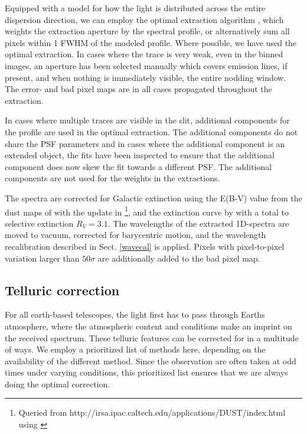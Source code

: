 \documentclass{aa}    %
\begin{document}
Equipped with a model for how the light is distributed across the entire
dispersion direction, we can  employ the optimal extraction algorithm
\cite{Horne1986}, which weights the extraction aperture by the spectral profile,
or alternatively sum all pixels within 1 FWHM of the modeled profile. Where
possible, we have used the optimal extraction. In cases where the trace is very
weak, even in the binned images, an aperture has been selected manually which
covers emission lines, if present, and when nothing is immediately visible, the
entire nodding window. The error- and bad pixel maps are in all cases propagated
throughout the extraction.

In cases where multiple traces are visible in the slit, additional components
for the profile are used in the optimal extraction. The additional components do
not share the PSF parameters and in cases where the additional component is an
extended object, the fits have been inspected to ensure that the additional
component does now skew the fit towards a different PSF. The additional
components are not used for the weights in the extractions.

The spectra are corrected for Galactic extinction using the E(B-V) value from
the dust maps of \citet{Schlegel1998} with the update in
\citet{Schlafly2011}\footnote{Queried from
	http://irsa.ipac.caltech.edu/applications/DUST/index.html using
	\citet{astroquery}}, and the extinction curve by \cite{Cardelli1989} with a
total to selective extinction $R_V = 3.1$. The wavelengths of the extracted
1D-spectra are moved to vacuum, corrected for barycentric motion, and the
wavelength recalibration described in Sect. \ref{wavecal} is applied. Pixels
with pixel-to-pixel variation larger than $50 \sigma$ are additionally added to
the bad pixel map.


\subsection{Telluric correction} \label{tell_corr}

For all earth-based telescopes, the light first has to pass through Earths
atmosphere, where the atmospheric content and conditions make an imprint on the
received spectrum. These telluric features can be corrected for in a multitude
of ways. We employ a prioritized list of methods here, depending on the
availability of the different method. Since the observation are often taken at
odd times under varying conditions, this prioritized list ensures that we are
always doing the optimal correction.
\end{document}
